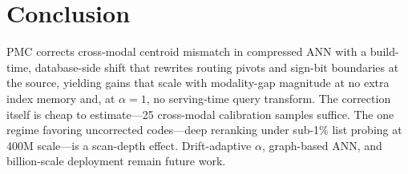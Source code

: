 \section{Conclusion}\label{sec:conclusion}

PMC corrects cross-modal centroid mismatch in compressed ANN with a build-time, database-side shift that rewrites routing pivots and sign-bit boundaries at the source, yielding gains that scale with modality-gap magnitude at no extra index memory and, at $\alpha{=}1$, no serving-time query transform. The correction itself is cheap to estimate---25 cross-modal calibration samples suffice. The one regime favoring uncorrected codes---deep reranking under sub-1\% list probing at 400M scale---is a scan-depth effect. Drift-adaptive $\alpha$, graph-based ANN, and billion-scale deployment remain future work.
